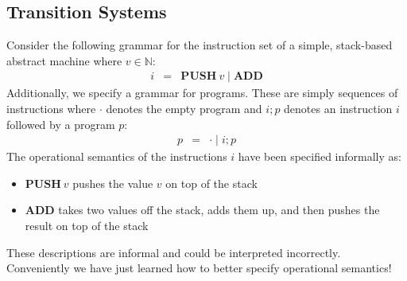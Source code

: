 \documentclass[10pt,a4paper]{exam}
\begin{document}
\begin{questions}

\section*{Transition Systems}

\question Consider the following grammar for the instruction set of a simple, stack-based abstract machine where $v \in \mathbb{N}$:
\begin{displaymath}
\begin{array}{lcl}
i & = & \mathbf{PUSH}~v \mid \mathbf{ADD}
\end{array}
\end{displaymath}
Additionally, we specify a grammar for programs. These are simply sequences of instructions where $\cdot$ denotes the empty program and $i;p$ denotes an instruction $i$ followed by a program $p$:
\begin{displaymath}
\begin{array}{lcl}
p & = & \cdot \mid i; p
\end{array}
\end{displaymath}
The operational semantics of the instructions $i$ have been specified informally as:
\begin{itemize}
\item $\mathbf{PUSH}~v$ pushes the value $v$ on top of the stack
\item $\mathbf{ADD}$ takes two values off the stack, adds them up, and then pushes the result on top of the stack
\end{itemize}
These descriptions are informal and could be interpreted incorrectly. Conveniently we have just learned how to better specify operational semantics! 
\end{questions}
\end{document}
